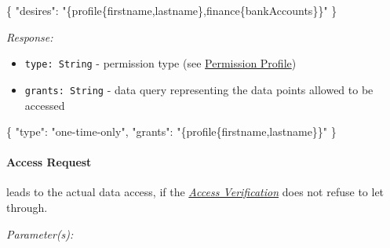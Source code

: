 \documentclass[12pt,english,a4paper,titlepage,cleardoublepage=empty,dottedtoc]{report}
\newenvironment{Shaded}{\begin{snugshade}}{\end{snugshade}}
\newcommand{\DataTypeTok}[1]{\textcolor[rgb]{0.13,0.29,0.53}{#1}}
\newcommand{\StringTok}[1]{\textcolor[rgb]{0.31,0.60,0.02}{#1}}
\newcommand{\FunctionTok}[1]{\textcolor[rgb]{0.00,0.00,0.00}{#1}}
\providecommand{\tightlist}{%
  \setlength{\itemsep}{0pt}\setlength{\parskip}{0pt}}
\begin{document}
\begin{Shaded}
\begin{Highlighting}[numbers=left,,]
\FunctionTok{\{}
    \DataTypeTok{"desires"}\FunctionTok{:} \StringTok{"\{profile\{firstname,lastname\},finance\{bankAccounts\}\}"}
\FunctionTok{\}}
\end{Highlighting}
\end{Shaded}

\emph{Response:}

\begin{itemize}
\tightlist
\item
  \texttt{type:\ String} - permission type (see
  \protect\hyperlink{permission-profile}{Permission Profile})
\item
  \texttt{grants:\ String} - data query representing the data points
  allowed to be accessed
\end{itemize}

\begin{Shaded}
\begin{Highlighting}[numbers=left,,]
\FunctionTok{\{}
    \DataTypeTok{"type"}\FunctionTok{:} \StringTok{"one-time-only"}\FunctionTok{,}
    \DataTypeTok{"grants"}\FunctionTok{:} \StringTok{"\{profile\{firstname,lastname\}\}"}
\FunctionTok{\}}
\end{Highlighting}
\end{Shaded}

\paragraph{Access Request}\label{spec_api_access-request}

leads to the actual data access, if the
\emph{\protect\hyperlink{access-verification}{Access Verification}} does
not refuse to let through.

\emph{Parameter(s):}
\end{document}

